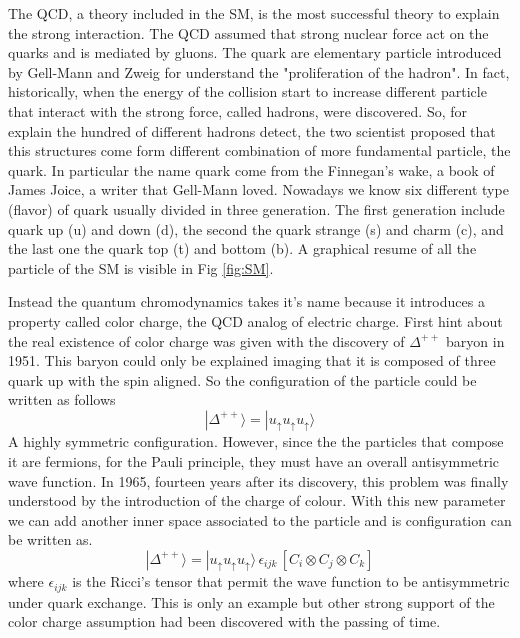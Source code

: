\documentclass[12pt,a4paper]{book}
\begin{document}
	
	The QCD, a theory included in the SM, is the most successful theory to explain the strong interaction. The QCD assumed that strong nuclear force act on the quarks and is mediated by gluons. The quark are elementary particle introduced by Gell-Mann and Zweig for understand the "proliferation of the hadron". In fact, historically, when the energy of the collision start to increase different particle that interact with the strong force, called hadrons, were discovered. So, for explain the hundred of different hadrons detect, the two scientist proposed that this structures come form different combination of more fundamental particle, the quark. In particular the name quark come from the Finnegan's wake, a book of James Joice, a writer that Gell-Mann loved. Nowadays we know six different type (flavor) of quark usually divided in three generation. The first generation include quark up (u) and down (d), the second the quark strange (s) and charm (c), and the last one the quark top (t) and bottom (b). A graphical resume of all the particle of the SM is visible in Fig \ref{fig:SM}.
	
	Instead the quantum chromodynamics takes it's name because it introduces a property called color charge, the QCD analog of electric charge. First hint about the real existence of color charge was given with the discovery of $\Delta^{++}$ baryon in 1951. This baryon could only be explained imaging that it is composed of three quark up with the spin aligned. So the configuration of the particle could be written as follows 
	\[
	|\Delta^{++}\rangle = | u_{\uparrow} u_{\uparrow} u_{\uparrow} \rangle
	\]
	A highly symmetric configuration. However, since the the particles that compose it are fermions, for the Pauli principle, they must have an overall antisymmetric wave function. In 1965, fourteen years after its discovery, this problem was finally understood by the introduction of the charge of colour. With this new parameter we can add another inner space associated to the particle and is configuration can be written as.
	\[
	|\Delta^{++}\rangle = | u_{\uparrow} u_{\uparrow} u_{\uparrow} \rangle \, \epsilon_{ijk} \, \left[ C_i \otimes C_j \otimes C_k \right]
	\]
	where $\epsilon_{ijk}$ is the Ricci's tensor that permit the wave function to be antisymmetric under quark exchange. This is only an example but other strong support of the color charge assumption had been discovered with the passing of time.
	
\end{document}
